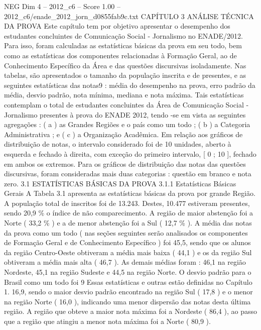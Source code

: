 \begin{textsample}{NEG Dim 4 – 2012\_c6 – Score 1.00 – 2012\_c6/enade\_2012\_jorn\_d0855fab9c.txt}  \label{ex:f4_neg_235}
CAPÍTULO 3 ANÁLISE TÉCNICA DA PROVA Este capítulo tem por objetivo apresentar o desempenho dos estudantes concluintes de Comunicação Social - Jornalismo no ENADE/2012.
Para isso, foram calculadas as estatísticas básicas da prova em seu todo, bem como as estatísticas dos componentes relacionadas à Formação Geral, ao de Conhecimento Específico da Área e das questões discursivas isoladamente.
Nas tabelas, são apresentados o tamanho da população inscrita e de presentes, e as seguintes estatísticas das notas9 : média do desempenho na prova, erro padrão da média, desvio padrão, nota mínima, mediana e nota máxima.
Tais estatísticas contemplam o total de estudantes concluintes da Área de Comunicação Social - Jornalismo presentes à prova do ENADE 2012, tendo -se em vista as seguintes agregações : ( a ) as Grandes Regiões e o país como um todo ; ( b ) a Categoria Administrativa ; e ( c ) a Organização Acadêmica.
Em relação aos gráficos de distribuição de notas, o intervalo considerado foi de 10 unidades, aberto à esquerda e fechado à direita, com exceção do primeiro intervalo, [ 0 ; 10 ], fechado em ambos os extremos.
Para os gráficos de distribuição das notas das questões discursivas, foram consideradas mais duas categorias : questão em branco e nota zero. 3.1 ESTATÍSTICAS BÁSICAS DA PROVA 3.1.1 Estatísticas Básicas Gerais A Tabela 3.1 apresenta as estatísticas básicas da prova por grande Região.
A população total de inscritos foi de 13.243.
Destes, 10.477 estiveram presentes, sendo 20,9 \% o índice de não comparecimento.
A região de maior abstenção foi a Norte ( 33,2 \% ) e a de menor abstenção foi a Sul ( 12,7 \% ).
A média das notas da prova como um todo ( nas seções seguintes serão analisados os componentes de Formação Geral e de Conhecimento Específico ) foi 45,5, sendo que os alunos da região Centro-Oeste obtiveram a média mais baixa ( 44,1 ) e os da região Sul obtiveram a média mais alta ( 46,7 ).
As demais médias foram : 46,1 na região Nordeste, 45,1 na região Sudeste e 44,5 na região Norte.
O desvio padrão para o Brasil como um todo foi 9 Essas estatísticas e outras estão definidas no Capítulo 1. 16,9, sendo o maior desvio padrão encontrado na região Sul ( 17,8 ) e o menor na região Norte ( 16,0 ), indicando uma menor dispersão das notas desta última região.
A região que obteve a maior nota máxima foi a Nordeste ( 86,4 ), ao passo que a região que atingiu a menor nota máxima foi a Norte ( 80,9 ).

\end{textsample}
